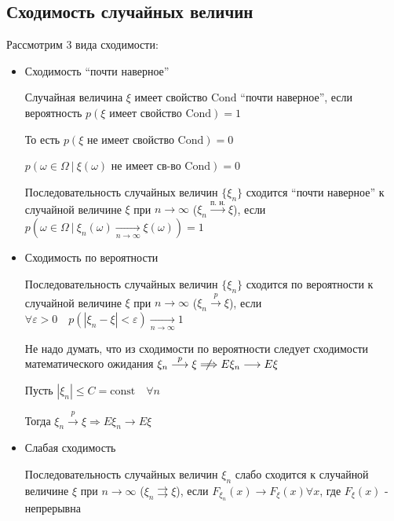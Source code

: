 \documentclass[12pt]{article}
\begin{document}
    \subsection{Сходимость случайных величин}

    \hypertarget{convergencetypes}{}

    Рассмотрим 3 вида сходимости:

    \begin{itemize}
        \item Сходимость \enquote{почти наверное}

        \Defs Случайная величина $\xi$ имеет свойство $\mathrm{Cond}$ \enquote{почти наверное}, если вероятность $p(\xi \text{ имеет свойство } \mathrm{Cond}) = 1$
    
        \Nota То есть $p(\xi \text{ не имеет свойство } \mathrm{Cond}) = 0$

        $p(\omega \in \Omega \ | \ \xi(\omega) \text{ не имеет св-во } \mathrm{Cond}) = 0$

        \Def Последовательность случайных величин $\{\xi_n\}$ сходится \enquote{почти наверное} к случайной величине $\xi$ при $n \to \infty$ ($\xi_n \overset{\text{п. н.}}{\longrightarrow} \xi$), 
        если $p(\omega \in \Omega \ | \ \xi_n(\omega) \underset{n \to \infty}{\longrightarrow} \xi(\omega)) = 1$

        \item Сходимость по вероятности

        \Defs Последовательность случайных величин $\{\xi_n\}$ сходится по вероятности к случайной величине $\xi$ при $n \to \infty$
        ($\xi_n \overset{p}{\longrightarrow} \xi$), если $\forall \varepsilon > 0 \quad p(|\xi_n - \xi| < \varepsilon) \underset{n \to \infty}{\longrightarrow} 1$
        
        \Nota Не надо думать, что из сходимости по вероятности следует сходимости математического ожидания $\xi_n \overset{p}{\longrightarrow} \xi \centernot{\Longrightarrow} E\xi_n \longrightarrow E\xi$

        \begin{MyTheorem}
            \Ths Пусть $|\xi_n| \leq C = \mathrm{const} \quad \forall n$

            Тогда $\xi_n \overset{p}{\longrightarrow} \xi \Longrightarrow E\xi_n \longrightarrow E\xi$
        \end{MyTheorem}

        \item Слабая сходимость

        \Defs Последовательность случайных величин $\xi_n$ слабо сходится к случайной величине $\xi$ при $n \to \infty$
        ($\xi_n \rightrightarrows \xi$), если $F_{\xi_n}(x) \longrightarrow F_\xi(x) \forall x$, где $F_\xi(x)$ - непрерывна
    
    \end{itemize}
\end{document}
